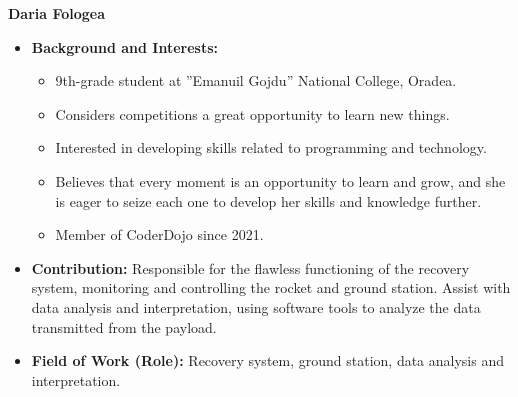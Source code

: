\item[] \textbf{Daria Fologea}
    \begin{itemize}[label=]
        \item[\faGraduationCap] \textbf{Background and Interests:} 
        \begin{itemize}[label=\textbullet]
            \item 9th-grade student at ”Emanuil Gojdu” National College, Oradea.
            \item Considers competitions a great opportunity to learn new things.
            \item Interested in developing skills related to programming and technology.
            \item Believes that every moment is an opportunity to learn and grow, and she is eager to seize each one to develop her skills and knowledge further.
            \item Member of CoderDojo since 2021.
        \end{itemize}
        \item[\faEdit] \textbf{Contribution:} Responsible for the flawless functioning of the recovery system, monitoring and controlling the rocket and ground station. Assist with data analysis and interpretation, using software tools to analyze the data transmitted from the payload.
        \item[\faMicroscope] \textbf{Field of Work (Role):} Recovery system, ground station, data analysis and interpretation.
    \end{itemize}
    \vspace{0.2 cm}
    